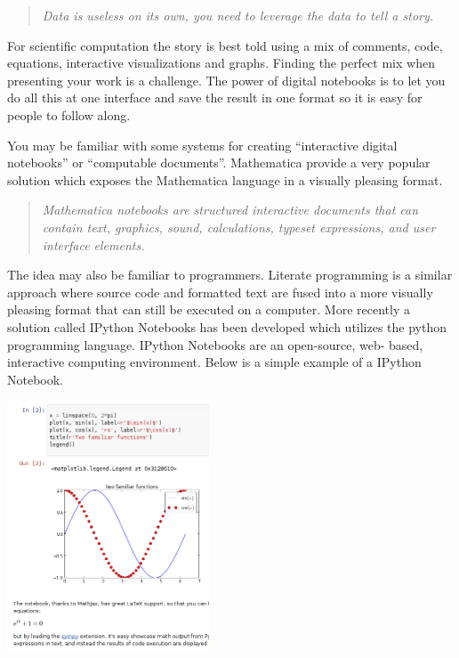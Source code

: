\documentclass[11pt, a4paper]{article}  %
\begin{document}
\begin{multicols}{2}
\begin{quote} 
\textit {Data is useless on its own, you need to leverage the data to tell a
story.}
\end{quote}

For scientific computation the story is best told using a mix of comments,
code, equations, interactive visualizations and graphs. Finding the perfect
mix when presenting your work is a challenge. The power of digital notebooks
is to let you do all this at one interface and save the result in one format
so it is easy for people to follow along.

You may be familiar with some systems for creating ``interactive digital
notebooks'' or ``computable documents''. Mathematica provide a very popular
solution which exposes the Mathematica language in a visually pleasing format.
\cite{mm}

\begin{quote}
\textit{ Mathematica notebooks are structured interactive documents that can
contain text, graphics, sound, calculations, typeset expressions, and user
interface elements.}
\end{quote}

The idea may also be familiar to programmers. Literate programming is a
similar approach where source code and formatted text are fused into a more
visually pleasing format that can still be executed on a computer. More
recently a solution called IPython Notebooks has been developed which utilizes
the python programming language. IPython Notebooks are an open-source, web-
based, interactive computing environment. Below is a simple example of a
IPython Notebook.

\begin{center}
\includegraphics[width=0.45\textwidth]{pic.png}
\end{center}


\end{multicols}
\end{document}
